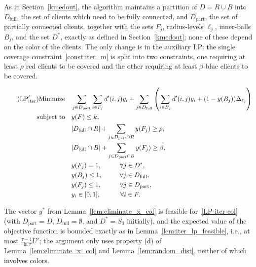 As in Section~\ref{kmedout}, the algorithm maintains a partition of $D = R \cup B$ into $D_\text{full}$, the set of clients which need to be fully connected, and $D_\text{part}$, the set of partially connected clients, together with the sets $F_j$, radius-levels $\ell_j$, inner-balls $B_j$, and the set $D^*$, exactly as defined in Section~\ref{kmedout}; none of these depend on the color of the clients. The only change is in the auxiliary LP: the single coverage constraint~\eqref{const:iter_m} is split into two constraints, one requiring at least $\rho$ red clients to be covered and the other requiring at least $\beta$ blue clients to be covered.

\begin{align} \tag{$\text{LP}_{\text{iter}}'$} \label{LP-iter-col}
\text{Minimize} \quad & \sum_{j \in D_\text{part}} \sum_{i \in F_j} d'(i,j) y_i + \sum_{j \in D_\text{full}} \left( \sum_{i \in B_j} d'(i,j) y_i + (1 - y(B_j)) \Delta_{\ell_j} \right) \\
\text{subject to} \quad & y(F) \leq k, \label{const:iter_col_k} \\
& |D_\text{full} \cap R| + \sum_{j \in D_\text{part} \cap R} y(F_j) \geq \rho, \label{const:iter_col_rho} \\
& |D_\text{full} \cap B| + \sum_{j \in D_\text{part} \cap B} y(F_j) \geq \beta, \label{const:iter_col_beta} \\
& y(F_j) = 1, \hspace{1cm} \forall j \in D^*, \label{const:iter_col_Dstar} \\
& y(B_j) \leq 1, \hspace{0.95cm} \forall j \in D_\text{full}, \label{const:iter_col_B_full} \\
& y(F_j) \leq 1, \hspace{1cm} \forall j \in D_\text{part}, \label{const:iter_col_F_part} \\
& y_i \in [0,1], \hspace{1.08cm} \forall i \in F. \label{const:iter_col_domain}
\end{align}

The vector $y^*$ from Lemma~\ref{lem:eliminate_x_col} is feasible for~\eqref{LP-iter-col} (with $D_\text{part} = D$, $D_\text{full} = \emptyset$, and $D^* = S_0$ initially), and the expected value of the objective function is bounded exactly as in Lemma~\ref{lem:iter_lp_feasible}, i.e., at most $\frac{\tau-1}{\ln \tau}\tilde{U}'$; the argument only uses property (d) of Lemma~\ref{lem:eliminate_x_col} and Lemma~\ref{lem:random_dist}, neither of which involves colors.


